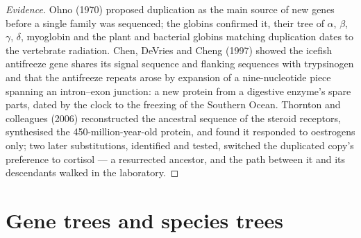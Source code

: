 \begin{proof}[Evidence]
Ohno (1970) proposed duplication as the main source of new genes
before a single family was sequenced; the globins confirmed it, their
tree of $\alpha$, $\beta$, $\gamma$, $\delta$, myoglobin and the plant
and bacterial globins matching duplication dates to the vertebrate
radiation. Chen, DeVries and Cheng (1997) showed the icefish antifreeze
gene shares its signal sequence and flanking sequences with trypsinogen
and that the antifreeze repeats arose by expansion of a nine-nucleotide
piece spanning an intron--exon junction: a new protein from a
digestive enzyme's spare parts, dated by the clock to the freezing of
the Southern Ocean. Thornton and colleagues (2006) reconstructed the
ancestral sequence of the steroid receptors, synthesised the
450-million-year-old protein, and found it responded to oestrogens
only; two later substitutions, identified and tested, switched the
duplicated copy's preference to cortisol --- a resurrected ancestor,
and the path between it and its descendants walked in the laboratory.
\end{proof}

\section{Gene trees and species trees}

